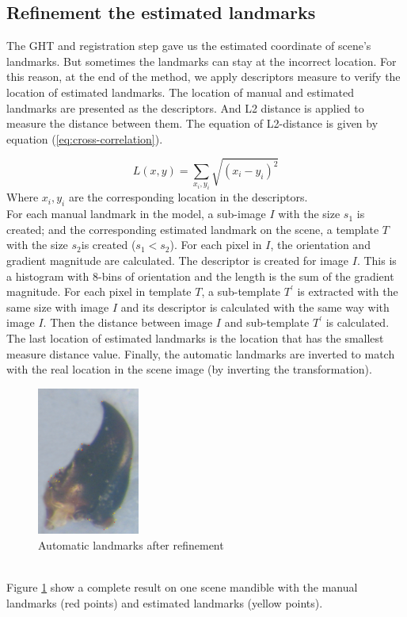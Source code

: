 \documentclass[twoside,twocolumn,10pt]{article}
\begin{document}
\subsection{Refinement the estimated landmarks}
The GHT and registration step gave us the estimated coordinate of
scene's landmarks. But sometimes the landmarks can stay at the
incorrect location. For this reason, at the end of the method, we
apply descriptors measure\cite{sift} to verify the location of
estimated landmarks. The location of manual and estimated landmarks
are presented as the descriptors. And L2 distance is applied to
measure the distance between them. The equation of L2-distance is
given by equation (\ref{eq:cross-correlation}).

\begin{equation}
\label{eq:cross-correlation}
	L(x,y) = \sum\limits_{x_i,y_i}\sqrt{(x_i-y_i)^2}
\end{equation}
Where $x_i, y_i $ are the corresponding location in the descriptors.\\[0.2cm]
For each manual landmark in the model, a sub-image \textit{$I$} with
the size \textit{$s_1$} is created; and the corresponding estimated
landmark on the scene, a template \textit{$T$} with the size
\textit{$s_2$}is created (\textit{$s_1 < s_2$}). For each pixel in
\textit{$I$}, the orientation and gradient magnitude are
calculated. The descriptor is created for image \textit{$I$}. This is
a histogram with 8-bins of orientation and the length is the sum of
the gradient magnitude. For each pixel in template \textit{$T$}, a
sub-template \textit{$T^{'}$} is extracted with the same size with
image \textit{$I$} and its descriptor is calculated with the same way
with image \textit{$I$}. Then the distance between image \textit{$I$}
and sub-template \textit{$T^{'}$} is calculated. The last location of
estimated landmarks is the location that has the smallest measure
distance value. Finally, the automatic landmarks are inverted to match
with the real location in the scene image (by inverting the
transformation).

\begin{figure}[htb]
    \centering
    \includegraphics[width=0.3\textwidth]{./images/result}
    \caption{Automatic landmarks after refinement}
    \label{figresult}
\end{figure}~\\
Figure \ref{figresult} show a complete result on one scene mandible with the manual landmarks (red points) and estimated landmarks (yellow points).
\end{document}
